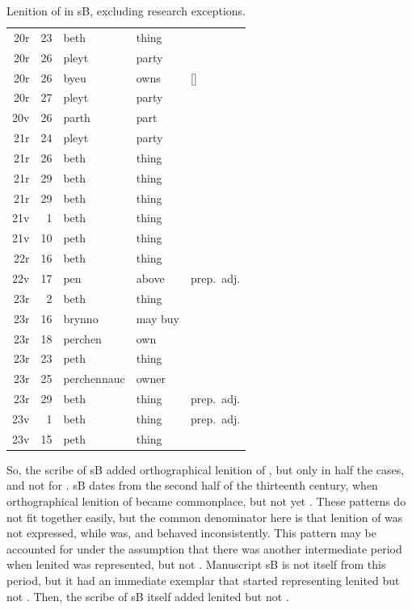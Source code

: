 \begin{table}[h]
  \centering
  \caption{Lenition of  in \gls{sB}, excluding research exceptions.}
  \label{tab:lenpsbexre}%
  \begin{tabular}{ddwql}
    \toprule
     &  &  &  &  \\
    \midrule
    20r & 23 & beth & thing &  \\
    20r & 26 & pleyt & party &  \\
    20r & 26 & byeu & owns & [] \\
    20r & 27 & pleyt & party &  \\
    20v & 26 & parth & part &  \\
    21r & 24 & pleyt & party &  \\
    21r & 26 & beth & thing &  \\
    21r & 29 & beth & thing &  \\
    21r & 29 & beth & thing &  \\
    21v & 1 & beth & thing &  \\
    21v & 10 & peth & thing &  \\
    22r & 16 & beth & thing &  \\
    22v & 17 & pen & above & prep.\ adj. \\
    23r & 2 & beth & thing &  \\
    23r & 16 & brynno & may buy &  \\
    23r & 18 & perchen & own &  \\
    23r & 23 & peth & thing &  \\
    23r & 25 & perchennauc & owner &  \\
    23r & 29 & beth & thing & prep.\ adj. \\
    23v & 1 & beth & thing & prep.\ adj. \\
    23v & 15 & peth & thing &  \\
    \bottomrule
  \end{tabular}%
\end{table}%

So,  the scribe of \gls{sB}  added orthographical lenition of , but only in half the cases, and not for . \Gls{sB} dates from the second half of the thirteenth century, when orthographical lenition of  became commonplace, but not yet . These patterns do not fit together easily, but the common denominator here is that lenition of  was not expressed, while  was, and  behaved inconsistently. This pattern may be accounted for under the assumption that there was another intermediate period when lenited  was represented, but not . Manuscript \gls{sB} is not itself from this period, but it had an immediate exemplar that started representing lenited  but not . Then, the scribe of \gls{sB} itself added lenited  but not . 


